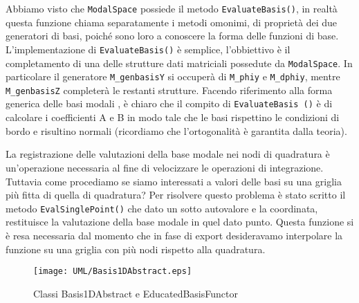 Abbiamo visto che \texttt{ModalSpace} possiede il metodo \texttt{EvaluateBasis()}, in realt\`a questa funzione chiama separatamente i metodi 
omonimi, di propriet\`a dei due generatori di basi, poich\'e sono loro a conoscere la forma delle funzioni di base. L'implementazione di \texttt
{EvaluateBasis()} \`e semplice, l'obbiettivo \`e il completamento di una delle strutture dati matriciali possedute da \texttt{ModalSpace}. In 
particolare il generatore \texttt{M\_genbasisY} si occuper\`a di \texttt{M\_phiy} e \texttt{M\_dphiy}, mentre \texttt{M\_genbasisZ} completer\`a 
le restanti strutture.
Facendo riferimento alla forma generica delle basi modali , \`e chiaro che il compito di \texttt{EvaluateBasis
()} \`e di calcolare i coefficienti A e B in modo tale che le basi rispettino le condizioni di bordo e risultino normali (ricordiamo che 
l'ortogonalit\`a \`e garantita dalla teoria).

La registrazione delle valutazioni della base modale nei nodi di quadratura \`e un'operazione necessaria al fine di velocizzare le operazioni di 
integrazione. Tuttavia come procediamo se siamo interessati a valori delle basi su una griglia pi\`u fitta di quella di quadratura? Per 
risolvere questo problema \`e stato scritto il metodo \texttt{EvalSinglePoint()} che dato un sotto autovalore e la coordinata, restituisce la 
valutazione della base modale in quel dato punto. Questa funzione si \`e resa necessaria dal momento che in fase di export desideravamo 
interpolare la funzione su una griglia con pi\`u nodi rispetto alla quadratura.

\begin{figure}[!htbp]
        \centering%
          {\label{fig: slice9}\texttt{[image: UML/Basis1DAbstract.eps]}}\qquad
        \caption{Classi Basis1DAbstract e EducatedBasisFunctor}
        \label{fig: UMLBasis}
\end{figure}

